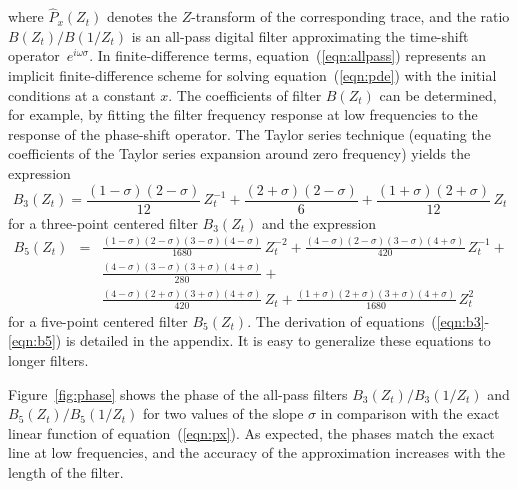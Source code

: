 where $\hat{P}_x (Z_t)$ denotes the $Z$-transform of the corresponding
trace, and the ratio $B(Z_t)/B(1/Z_t)$ is an all-pass digital filter
approximating the time-shift operator~$e^{i \omega \sigma}$. In
finite-difference terms, equation~(\ref{eqn:allpass}) represents an
implicit finite-difference scheme for solving equation~(\ref{eqn:pde})
with the initial conditions at a constant $x$.  The coefficients of
filter $B(Z_t)$ can be determined, for example, by fitting the filter
frequency response at low frequencies to the response of the
phase-shift operator. The Taylor series technique (equating the
coefficients of the Taylor series expansion around zero frequency)
yields the expression
\begin{equation}
  B_3(Z_t) = 
  \frac{(1-\sigma)(2-\sigma)}{12}\,Z_t^{-1} + 
  \frac{(2+\sigma)(2-\sigma)}{6} +
  \frac{(1+\sigma)(2+\sigma)}{12}\,Z_t
  \label{eqn:b3}
\end{equation}
for a three-point centered filter $B_3(Z_t)$ and the expression
\begin{eqnarray}
  B_5(Z_t) & = &  
  \frac{(1-\sigma)(2-\sigma)(3-\sigma)(4-\sigma)}{1680}\,Z_t^{-2} +
  \frac{(4-\sigma)(2-\sigma)(3-\sigma)(4+\sigma)}{420}\,Z_t^{-1} + 
  \nonumber \\
  & & 
  \frac{(4-\sigma)(3-\sigma)(3+\sigma)(4+\sigma)}{280} + 
  \nonumber \\
  & & 
  \frac{(4-\sigma)(2+\sigma)(3+\sigma)(4+\sigma)}{420}\,Z_t +
  \frac{(1+\sigma)(2+\sigma)(3+\sigma)(4+\sigma)}{1680}\,Z_t^2
  \label{eqn:b5}
\end{eqnarray} 
for a five-point centered filter $B_5(Z_t)$. The derivation of
equations~(\ref{eqn:b3}-\ref{eqn:b5}) is detailed in the appendix. It
is easy to generalize these equations to longer filters.


Figure~\ref{fig:phase} shows the phase of the all-pass filters
$B_3(Z_t)/B_3(1/Z_t)$ and $B_5(Z_t)/B_5(1/Z_t)$ for two values of the
slope $\sigma$ in comparison with the exact linear function of
equation~(\ref{eqn:px}).  As expected, the phases match the exact line
at low frequencies, and the accuracy of the approximation increases
with the length of the filter.

